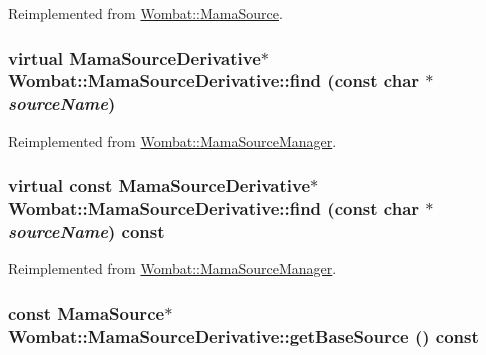 Reimplemented from \hyperlink{classWombat_1_1MamaSource_a798167fdd8717dab1954b2329f8f612f}{Wombat::MamaSource}.\hypertarget{classWombat_1_1MamaSourceDerivative_a625240eadddf0f2f2f08d7187dbbd9f6}{
\subsubsection[{find}]{\setlength{\rightskip}{0pt plus 5cm}virtual {\bf MamaSourceDerivative}$\ast$ Wombat::MamaSourceDerivative::find (const char $\ast$ {\em sourceName})}}
\label{classWombat_1_1MamaSourceDerivative_a625240eadddf0f2f2f08d7187dbbd9f6}


Reimplemented from \hyperlink{classWombat_1_1MamaSourceManager_a378d8f731a0482fdbcf4147fee8e8d16}{Wombat::MamaSourceManager}.\hypertarget{classWombat_1_1MamaSourceDerivative_a2c54840ec7876ccfd3213b021976132d}{
\subsubsection[{find}]{\setlength{\rightskip}{0pt plus 5cm}virtual const {\bf MamaSourceDerivative}$\ast$ Wombat::MamaSourceDerivative::find (const char $\ast$ {\em sourceName}) const}}
\label{classWombat_1_1MamaSourceDerivative_a2c54840ec7876ccfd3213b021976132d}


Reimplemented from \hyperlink{classWombat_1_1MamaSourceManager_aa54946b75daea1c445ce03b6f863dd56}{Wombat::MamaSourceManager}.\hypertarget{classWombat_1_1MamaSourceDerivative_adaf9a73812a106107cace0fd88a6cfc0}{
\subsubsection[{getBaseSource}]{\setlength{\rightskip}{0pt plus 5cm}const {\bf MamaSource}$\ast$ Wombat::MamaSourceDerivative::getBaseSource () const}}
\label{classWombat_1_1MamaSourceDerivative_adaf9a73812a106107cace0fd88a6cfc0}
